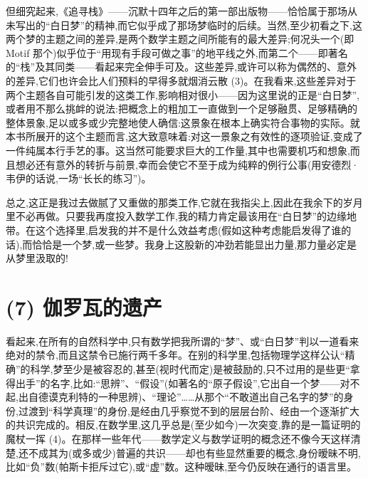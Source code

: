 但细究起来,《追寻栈》——沉默十四年之后的第一部出版物——恰恰属于那场从未写出的“白日梦”的精神,而它似乎成了那场梦临时的后续。当然,至少初看之下,这两个梦的主题之间的差异,是两个数学主题之间所能有的最大差异;何况头一个(即 Motif 那个)似乎位于“用现有手段可做之事”的地平线之外,而第二个——即著名的“栈”及其同类——看起来完全伸手可及。这些差异,或许可以称为偶然的、意外的差异,它们也许会比人们预料的早得多就烟消云散 (3)。在我看来,这些差异对于两个主题各自可能引发的这类工作,影响相对很小——因为这里说的正是“白日梦”,或者用不那么挑衅的说法:把概念上的粗加工一直做到一个足够融贯、足够精确的整体景象,足以或多或少完整地使人确信:这景象在根本上确实符合事物的实际。就本书所展开的这个主题而言,这大致意味着:对这一景象之有效性的逐项验证,变成了一件纯属本行手艺的事。这当然可能要求巨大的工作量,其中也需要机巧和想象,而且想必还有意外的转折与前景,幸而会使它不至于成为纯粹的例行公事(用安德烈·韦伊的话说,一场“长长的练习”)。

总之,这正是我过去做腻了又重做的那类工作,它就在我指尖上,因此在我余下的岁月里不必再做。只要我再度投入数学工作,我的精力肯定最该用在“白日梦”的边缘地带。在这个选择里,启发我的并不是什么效益考虑(假如这种考虑能启发得了谁的话),而恰恰是一个梦,或一些梦。我身上这股新的冲劲若能显出力量,那力量必定是从梦里汲取的!

\section{(7) 伽罗瓦的遗产}

 看起来,在所有的自然科学中,只有数学把我所谓的“梦”、或“白日梦”判以一道看来绝对的禁令,而且这禁令已施行两千多年。在别的科学里,包括物理学这样公认“精确”的科学,梦至少是被容忍的,甚至(视时代而定)是被鼓励的,只不过用的是些更“拿得出手”的名字,比如:“思辨”、“假设”(如著名的“原子假设”,它出自一个梦——对不起,出自德谟克利特的一种思辨)、“理论”……从那个“不敢道出自己名字的梦”的身份,过渡到“科学真理”的身份,是经由几乎察觉不到的层层台阶、经由一个逐渐扩大的共识完成的。相反,在数学里,这几乎总是(至少如今)一次突变,靠的是一篇证明的魔杖一挥 (4)。在那样一些年代——数学定义与数学证明的概念还不像今天这样清楚,还不成其为(或多或少)普遍的共识——却也有些显然重要的概念,身份暧昧不明,比如“负”数(帕斯卡拒斥过它),或“虚”数。这种暧昧,至今仍反映在通行的语言里。


